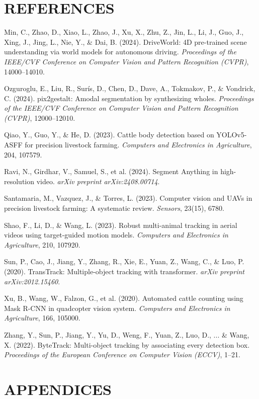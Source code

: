 \documentclass[12pt]{article}
\newenvironment{references}{
  \clearpage
  \section*{\centering \textbf{REFERENCES}}
  \begin{list}{}{
    \setlength{\leftmargin}{0.5in}
    \setlength{\itemindent}{-0.5in}
    \setlength{\itemsep}{\baselineskip}
    \setlength{\parsep}{0pt}
  }
}{
  \end{list}
}
\begin{document}
\begin{references}
\item Min, C., Zhao, D., Xiao, L., Zhao, J., Xu, X., Zhu, Z., Jin, L., Li, J., Guo, J., Xing, J., Jing, L., Nie, Y., \& Dai, B. (2024). DriveWorld: 4D pre-trained scene understanding via world models for autonomous driving. \textit{Proceedings of the IEEE/CVF Conference on Computer Vision and Pattern Recognition (CVPR)}, 14000--14010.
\item Ozguroglu, E., Liu, R., Surís, D., Chen, D., Dave, A., Tokmakov, P., \& Vondrick, C. (2024). pix2gestalt: Amodal segmentation by synthesizing wholes. \textit{Proceedings of the IEEE/CVF Conference on Computer Vision and Pattern Recognition (CVPR)}, 12000--12010.
\item Qiao, Y., Guo, Y., \& He, D. (2023). Cattle body detection based on YOLOv5-ASFF for precision livestock farming. \textit{Computers and Electronics in Agriculture}, 204, 107579.
\item Ravi, N., Girdhar, V., Samuel, S., et al. (2024). Segment Anything in high-resolution video. \textit{arXiv preprint arXiv:2408.00714}.
\item Santamaria, M., Vazquez, J., \& Torres, L. (2023). Computer vision and UAVs in precision livestock farming: A systematic review. \textit{Sensors}, 23(15), 6780.
\item Shao, F., Li, D., \& Wang, L. (2023). Robust multi-animal tracking in aerial videos using target-guided motion models. \textit{Computers and Electronics in Agriculture}, 210, 107920.
\item Sun, P., Cao, J., Jiang, Y., Zhang, R., Xie, E., Yuan, Z., Wang, C., \& Luo, P. (2020). TransTrack: Multiple-object tracking with transformer. \textit{arXiv preprint arXiv:2012.15460}.
\item Xu, B., Wang, W., Falzon, G., et al. (2020). Automated cattle counting using Mask R-CNN in quadcopter vision system. \textit{Computers and Electronics in Agriculture}, 166, 105000.
\item Zhang, Y., Sun, P., Jiang, Y., Yu, D., Weng, F., Yuan, Z., Luo, D., ... \& Wang, X. (2022). ByteTrack: Multi-object tracking by associating every detection box. \textit{Proceedings of the European Conference on Computer Vision (ECCV)}, 1--21.
\end{references}

\clearpage

\section*{\centering \textbf{APPENDICES}}
\end{document}
